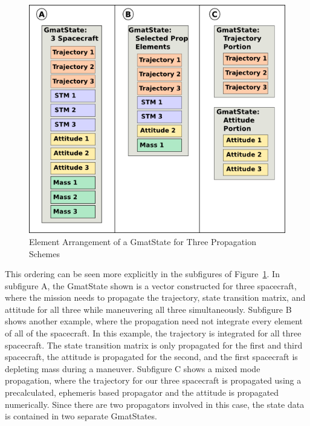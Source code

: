 \begin{figure}[htb]
\begin{center}
\includegraphics[268,239]{Images/ThreeStateVectors.png}
\caption[State Element Arrangement Examples]{\label{figure:ThreeSatPropVector}Element Arrangement
of a GmatState for Three Propagation Schemes}
\end{center}
\end{figure}

This ordering can be seen more explicitly in the subfigures of
Figure~\ref{figure:ThreeSatPropVector}.  In subfigure A, the GmatState shown is a vector constructed
for three spacecraft, where the mission needs to propagate the trajectory, state transition matrix,
and attitude for all three while maneuvering all three simultaneously.  Subfigure B shows another
example, where the propagation need not integrate every element of all of the spacecraft.  In this
example, the trajectory is integrated for all three spacecraft.  The state transition matrix is only
propagated for the first and third spacecraft, the attitude is propagated for the second, and the
first spacecraft is depleting mass during a maneuver.  Subfigure C shows a mixed mode propagation,
where the trajectory for our three spacecraft is propagated using a precalculated, ephemeris based
propagator and the attitude is propagated numerically.  Since there are two propagators involved in
this case, the state data is contained in two separate GmatStates.

